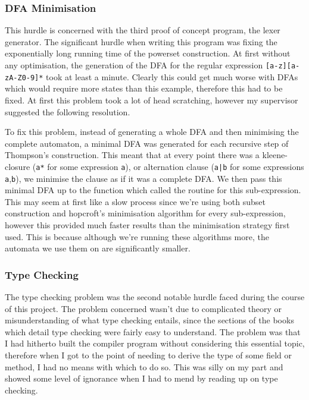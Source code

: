 \documentclass[a4paper, 11pt]{article}
\begin{document}
\subsubsection{DFA Minimisation}
This hurdle is concerned with the third proof of concept program, the lexer generator. The significant hurdle when writing this program was fixing the exponentially long running time of the powerset construction. At first without any optimisation, the generation of the DFA for the regular expression \texttt{[a-z][a-zA-Z0-9]*} took at least a minute. Clearly this could get much worse with DFAs which would require more states than this example, therefore this had to be fixed. At first this problem took a lot of head scratching, however my supervisor suggested the following resolution.

To fix this problem, instead of generating a whole DFA and then minimising the complete automaton, a minimal DFA was generated for each recursive step of Thompson's construction. This meant that at every point there was a kleene-closure (\texttt{a*} for some expression \texttt{a}), or alternation clause (\texttt{a|b} for some expressions \texttt{a},\texttt{b}), we minimise the clause as if it was a complete DFA. We then pass this minimal DFA up to the function which called the routine for this sub-expression. This may seem at first like a slow process since we're using both subset construction and hopcroft's minimisation algorithm for every sub-expression, however this provided much faster results than the minimisation strategy first used. This is because although we're running these algorithms more, the automata we use them on are significantly smaller.

\subsubsection{Type Checking}
The type checking problem was the second notable hurdle faced during the course of this project. The problem concerned wasn't due to complicated theory or misunderstanding of what type checking entails, since the sections of the books which detail type checking were fairly easy to understand. The problem was that I had hitherto built the compiler program without considering this essential topic, therefore when I got to the point of needing to derive the type of some field or method, I had no means with which to do so. This was silly on my part and showed some level of ignorance when I had to mend by reading up on type checking. 
\end{document}
